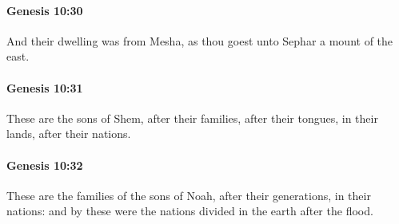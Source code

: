 		\paragraph{Genesis 10:30} %
			\label{GENESIS-10-30}

			And their dwelling was from Mesha, as thou goest unto Sephar a mount of the east.


		\paragraph{Genesis 10:31} %
			\label{GENESIS-10-31}

			These are the sons of Shem, after their families, after their tongues, in their lands, after their nations.


		\paragraph{Genesis 10:32} %
			\label{GENESIS-10-32}

			These are the families of the sons of Noah, after their generations, in their nations: and by these were the nations divided in the earth after the flood.


